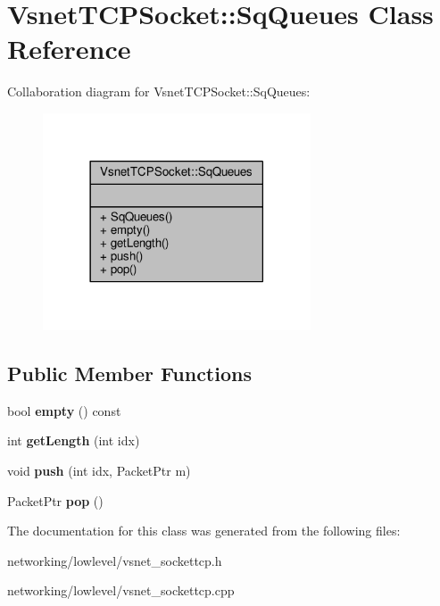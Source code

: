 \hypertarget{classVsnetTCPSocket_1_1SqQueues}{}\section{Vsnet\+T\+C\+P\+Socket\+:\+:Sq\+Queues Class Reference}
\label{classVsnetTCPSocket_1_1SqQueues}


Collaboration diagram for Vsnet\+T\+C\+P\+Socket\+:\+:Sq\+Queues\+:
\nopagebreak
\begin{figure}[H]
\begin{center}
\leavevmode
\includegraphics[width=225pt]{d9/dfd/classVsnetTCPSocket_1_1SqQueues__coll__graph}
\end{center}
\end{figure}
\subsection*{Public Member Functions}
\begin{DoxyCompactItemize}
\item 
bool {\bfseries empty} () const \hypertarget{classVsnetTCPSocket_1_1SqQueues_a4b8096fa619993174601cb16364bc76c}{}\label{classVsnetTCPSocket_1_1SqQueues_a4b8096fa619993174601cb16364bc76c}

\item 
int {\bfseries get\+Length} (int idx)\hypertarget{classVsnetTCPSocket_1_1SqQueues_a715483903c2091e9224296dba829ff70}{}\label{classVsnetTCPSocket_1_1SqQueues_a715483903c2091e9224296dba829ff70}

\item 
void {\bfseries push} (int idx, Packet\+Ptr m)\hypertarget{classVsnetTCPSocket_1_1SqQueues_a6c76f4d3fa614163baf4b843f2efa22a}{}\label{classVsnetTCPSocket_1_1SqQueues_a6c76f4d3fa614163baf4b843f2efa22a}

\item 
Packet\+Ptr {\bfseries pop} ()\hypertarget{classVsnetTCPSocket_1_1SqQueues_ae154590a9582e97cf2d7e39ade0c0d86}{}\label{classVsnetTCPSocket_1_1SqQueues_ae154590a9582e97cf2d7e39ade0c0d86}

\end{DoxyCompactItemize}


The documentation for this class was generated from the following files\+:\begin{DoxyCompactItemize}
\item 
networking/lowlevel/vsnet\+\_\+sockettcp.\+h\item 
networking/lowlevel/vsnet\+\_\+sockettcp.\+cpp\end{DoxyCompactItemize}
